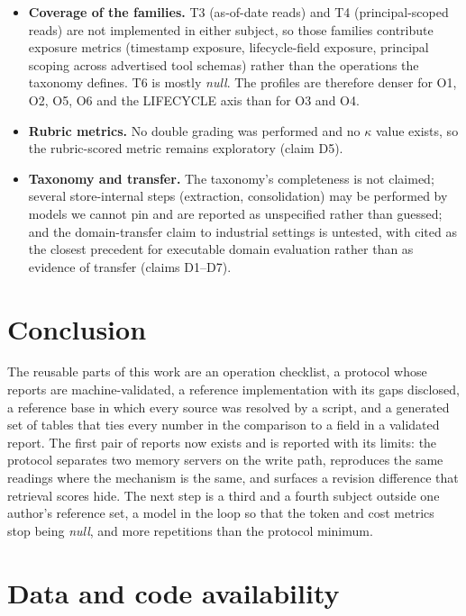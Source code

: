 \documentclass[11pt,a4paper]{article}
\begin{document}
\begin{itemize}[leftmargin=1.4em]
one command is everything downstream of the reports: validation, the tables, and every number in
this paper.
\item \textbf{Coverage of the families.} T3 (as-of-date reads) and T4 (principal-scoped reads)
are not implemented in either subject, so those families contribute exposure metrics (timestamp
exposure, lifecycle-field exposure, principal scoping across advertised tool schemas) rather
than the operations the taxonomy defines. T6 is mostly \textit{null}. The profiles are therefore
denser for O1, O2, O5, O6 and the LIFECYCLE axis than for O3 and O4.
\item \textbf{Rubric metrics.} No double grading was performed and no $\kappa$ value exists, so
the rubric-scored metric remains exploratory (claim D5).
\item \textbf{Taxonomy and transfer.} The taxonomy's completeness is not claimed; several
store-internal steps (extraction, consolidation) may be performed by models we cannot pin and
are reported as unspecified rather than guessed; and the domain-transfer claim to industrial
settings is untested, with \cite{trashchenkov2026power} cited as the closest precedent for
executable domain evaluation rather than as evidence of transfer (claims D1--D7).
\end{itemize}

\section{Conclusion}

The reusable parts of this work are an operation checklist, a protocol whose reports are
machine-validated, a reference implementation with its gaps disclosed, a reference base in which
every source was resolved by a script, and a generated set of tables that ties every number in
the comparison to a field in a validated report. The first pair of reports now exists and is
reported with its limits: the protocol separates two memory servers on the write path,
reproduces the same readings where the mechanism is the same, and surfaces a revision difference
that retrieval scores hide. The next step is a third and a fourth subject outside one author's
reference set, a model in the loop so that the token and cost metrics stop being \textit{null},
and more repetitions than the protocol minimum.

\section*{Data and code availability}
\end{document}
